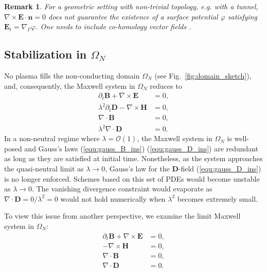 \documentclass{article}
\newtheorem*{remark}{Remark}
\begin{document}
\begin{remark} For a geometric setting with non-trivial topology, e.g. with a tunnel,
  $\nabla \times \mathbf{E}\cdot\mathbf{n} = 0$ does not guarantee the existence of a surface
  potential $\varphi$ satisfying $\mathbf{E}_t = \nabla_\Gamma\varphi$. One needs to
  include co-homology vector fields \cite{Hiptmair_2021}.
\end{remark}

\subsection{Stabilization in $\Omega_{N}$}
\label{sec:reform_continuous}

No plasma fills the non-conducting domain $\Omega_N$ (see Fig.~\ref{fig:domain_sketch}),
and, consequently, the Maxwell system in $\Omega_N$ reduces to 
\begin{subequations}
  \label{eq:mxon}
\begin{align}
    \partial_t \mathbf{B} + \nabla \times \mathbf{E} &= 0, \label{equ:faraday_ins}\\ 
    \lambda^2 \partial_t \mathbf{D} - \nabla \times \mathbf{H} &= 0,  \label{equ:ampere_ins}\\
    \nabla \cdot \mathbf{B} &= 0, \label{equ:gauss_B_ins}\\
    \lambda^2 \nabla \cdot \mathbf{D} &= 0 \label{equ:gauss_D_ins}.
\end{align}
\end{subequations}
In a non-neutral regime where $\lambda = \mathcal{O}(1)$, the Maxwell system in $\Omega_N$
is well-posed and Gauss's laws (\ref{equ:gauss_B_ins}) (\ref{equ:gauss_D_ins}) are
redundant as long as they are satisfied at initial time. Nonetheless, as the system
approaches the quasi-neutral limit as $\lambda \rightarrow 0$, Gauss's law for the
$\mathbf{D}$-field (\ref{equ:gauss_D_ins}) is no longer enforced. Schemes based on this set
of PDEs would become unstable as $\lambda \rightarrow 0$. The vanishing divergence
constraint would evaporate as $\nabla \cdot \mathbf{D} = 0/\lambda^2 = 0$ would not hold
numerically when $\lambda^2$ becomes extremely small.

To view this issue from another perspective, we examine the limit Maxwell system in
$\Omega_N$:
\begin{subequations}
\begin{align}
    \partial_t \mathbf{B} + \nabla \times \mathbf{E} &= 0, \label{equ:faraday_ins_limit}\\ 
    - \nabla \times \mathbf{H} &= 0,  \label{equ:ampere_ins_limit}\\
    \nabla \cdot \mathbf{B} &= 0, \label{equ:gauss_B_ins_limit}\\
    \nabla \cdot \mathbf{D} &= 0 \label{equ:gaus_D_ins_limit}.
\end{align}
\end{subequations}
\end{document}
